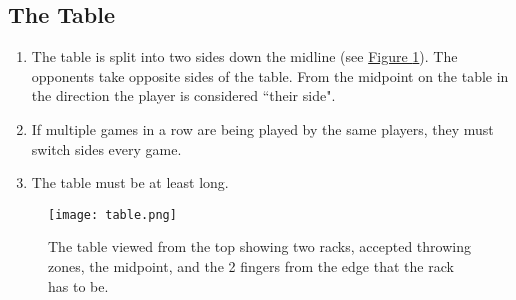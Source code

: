 	\subsection{The Table}\label{ssec:Table}
        \begin{enumerate}[label=(\roman*), ref=\roman*]
            \item \label{sssec:Table,sides} The table is split into two sides down the midline (see \hyperref[fig:table]{Figure \ref*{fig:table}}).
			    The opponents take opposite sides of the table. 
			    From the midpoint on the table in the direction the player is considered ``their side". 
            \item \label{sssec:Table,switch} If multiple games in a row are being played by the same players, they must switch sides every game. 
            \item \label{sssec:Table,length} The table must be at least  long. 
        \end{enumerate}
        \begin{figure}[H]
            \centering
            \texttt{[image: table.png]}
            \caption{The table viewed from the top showing two racks, accepted throwing zones, the midpoint, and the 2 fingers from the edge that the rack has to be.}
            \label{fig:table}
        \end{figure}
